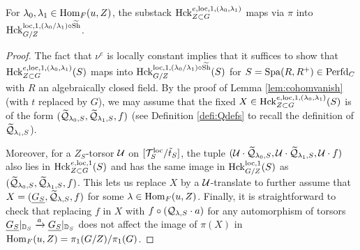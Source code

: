 \begin{prop}\label{prop:Quotslope}
  For $\lambda_{0}, \lambda_{1} \in \mathrm{Hom}_{F}(u,Z)$, the substack $\mathrm{Hck}_{Z \subset G}^{e,\mathrm{loc},1,(\lambda_{0},\lambda_{1})}$ maps via $\pi$ into $\mathrm{Hck}_{G/Z}^{\mathrm{loc},1,(\lambda_{0}/\lambda_{1}) \circ \widetilde{\textnormal{Sh}}}$.  
\end{prop}

\begin{proof}
The fact that $\nu^{e}$ is locally constant implies that it suffices to show that $\mathrm{Hck}_{Z \subset G}^{e,\mathrm{loc},1,(\lambda_{0},\lambda_{1})}(S)$ maps into $\mathrm{Hck}_{G/Z}^{\mathrm{loc},1,(\lambda_{0}/\lambda_{1}) \circ \widetilde{\textnormal{Sh}}}(S)$ for $S = \mathrm{Spa}(R,R^{+}) \in \mathrm{Perfd}_{C}$ with $R$ an algebraically closed field. By the proof of Lemma \ref{lem:cohomvanish} (with $t$ replaced by $G$), we may assume that the fixed $X \in \mathrm{Hck}_{Z \subset G}^{e,\mathrm{loc},1,(\lambda_{0},\lambda_{1})}(S)$ is of the form $(\widetilde{\mathcal{Q}}_{\lambda_{0},S}, \widetilde{\mathcal{Q}}_{\lambda_{1},S},f)$ (see Definition \ref{defi:Qdefs} to recall the definition of $\widetilde{\mathcal{Q}}_{\lambda_{i},S}$). 


Moreover, for a $Z_{S}$-torsor $\mathcal{U}$ on  $[\mathcal{T}_{S}^{\mathrm{loc}}/\tilde{t}_{S}]$, the tuple  $(\mathcal{U} \cdot \widetilde{\mathcal{Q}}_{\lambda_{0},S}, \mathcal{U} \cdot \widetilde{\mathcal{Q}}_{\lambda_{1},S},\mathcal{U} \cdot f)$ also lies in $\mathrm{Hck}_{Z \subset G}^{e,\mathrm{loc},1}(S)$ and has the same image in $\mathrm{Hck}_{G/Z}^{\mathrm{loc},1}(S)$ as $(\widetilde{\mathcal{Q}}_{\lambda_{0},S}, \widetilde{\mathcal{Q}}_{\lambda_{1},S},f)$. This lets us replace $X$ by a $\mathcal{U}$-translate to further assume that $X = (\underline{G_{S}},\widetilde{\mathcal{Q}}_{\lambda,S},f)$ for some $\lambda \in \mathrm{Hom}_{F}(u,Z)$. Finally, it is straightforward to check that replacing $f$ in $X$ with $f \circ (\mathcal{Q}_{\lambda,S} \cdot a)$ for any automorphism of torsors $\underline{G_{S}}|_{\mathbb D_{S}} \xrightarrow{a} \underline{G_{S}}|_{\mathbb D_{S}}$ does not affect the image of $\pi(X)$ in
$\mathrm{Hom}_{F}(u,Z) = \pi_{1}(G/Z)/\pi_{1}(G)$. 


\end{proof}
